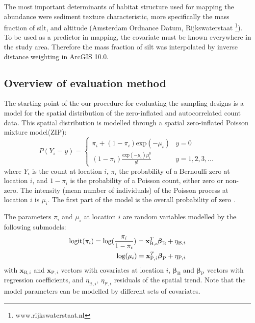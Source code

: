 \documentclass[review]{elsarticle}
\newcommand{\xbf}{\ensuremath{\mathbf x}}
\begin{document}
The most important determinants of habitat structure used for mapping the abundance were sediment texture characteristic, more specifically the mass fraction of silt, and altitude (Amsterdam Ordnance Datum, Rijkswaterstaat \footnote{www.rijkswaterstaat.nl}). To be used as a predictor in mapping, the covariate must be known everywhere in the study area. Therefore the mass fraction of silt was interpolated by inverse distance weighting in ArcGIS 10.0.

\subsection{Overview of evaluation method}
The starting point of the our procedure for evaluating the sampling designs is a model for the spatial distribution of the zero-inflated and autocorrelated count data. This spatial distribution is modelled through a spatial zero-inflated Poisson mixture model(ZIP)\citep{lambert1992, agarwal2002}:
\begin{equation}
    P(Y_i=y)=
\begin{cases}
\pi_i+(1-\pi_i)\text{exp}(-\mu_i) & y=0 \\
(1-\pi_i)\frac{\text{exp}(-\mu_i)\mu_i^{y}}{y!}& y=1,2,3,\ldots
\end{cases}
\end{equation}
where $Y_i$ is the count at location $i$, $\pi_i$ the probability of a Bernoulli zero at location $i$, and $1-\pi_i$ is the probability of a Poisson count, either zero or non-zero. The intensity (mean number of individuals) of the Poisson process at location $i$ is $\mu_i$. The first part of the model is the overall probability of zero \citep{hilbe2007}.

The parameters $\pi_i$ and $\mu_i$ at location $i$ are random variables modelled by the following submodels:
\begin{eqnarray} \label{eq:glsm}
\text{logit}(\pi_{i})=\text{log}(\frac{\pi_{i}}{1-\pi_{i}})=\xbf_{\mathrm{B},i}^{T}\boldsymbol{\beta}_{\rm{B}} + \eta_{\mathrm{B},i} \nonumber \\
\text{log}(\mu_i)=\xbf_{\mathrm{P},i}^{T}\boldsymbol{\beta}_{\rm{P}} + \eta_{\mathrm{P},i}
\end{eqnarray}
with $\xbf_{\mathrm{B},i}$ and $\xbf_{\mathrm{P},i}$ vectors with covariates at location $i$, $\boldsymbol{\beta}_{\mathrm{B}}$ and $\boldsymbol{\beta}_{\mathrm{P}}$ vectors with regression coefficients, and $\eta_{\mathrm{B},i}$, $\eta_{\mathrm{P},i}$ residuals of the spatial trend. Note that the model parameters can be modelled by different sets of covariates.
\end{document}
